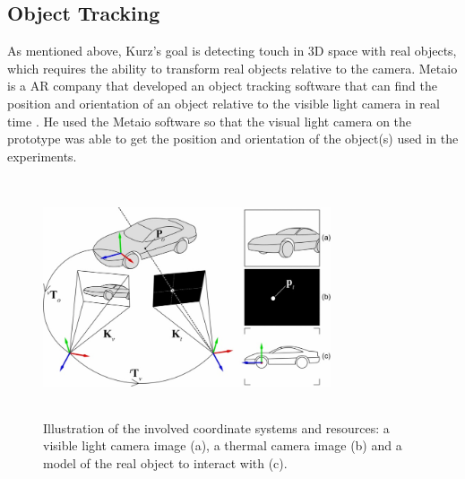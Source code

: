 \documentclass{sig-alternate}
\begin{document}
\subsection{Object Tracking}
\label{Object Tracking}
As mentioned above,  Kurz's goal is detecting touch in 3D space with real objects, which requires the ability to transform real objects relative to the camera. Metaio is a AR company that developed an object tracking software that can find the position and orientation of an object relative to the visible light camera in real time \cite{Thermal}. He used the Metaio software so that the visual light camera on the prototype was able to get the position and orientation of the object(s) used in the experiments.     

\begin{figure}
	\includegraphics[width=8.5cm, height=7cm]{Tracking}
	\caption{Illustration of the involved coordinate systems and resources: a visible light camera image (a), a thermal camera image (b) and a model of the real object to interact with (c).\cite{Thermal}}
	\label{fig:Tracking}
\end{figure}

\end{document}

